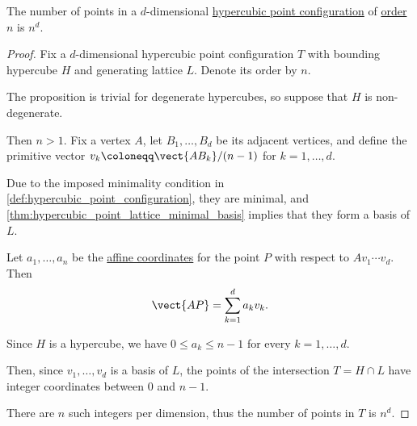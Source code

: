 \begin{proposition}\label{thm:hypercubic_point_configuration_cardinality}
  The number of points in a \( d \)-dimensional \hyperref[def:hypercubic_point_configuration]{hypercubic point configuration} of \hyperref[def:hypercubic_point_configuration_order]{order} \( n \) is \( n^d \).
\end{proposition}
\begin{proof}
  Fix a \( d \)-dimensional hypercubic point configuration \( T \) with bounding hypercube \( H \) and generating lattice \( L \). Denote its order by \( n \).

  The proposition is trivial for degenerate hypercubes, so suppose that \( H \) is non-degenerate.

  Then \( n > 1 \). Fix a vertex \( A \), let \( B_1, \ldots, B_d \) be its adjacent vertices, and define the primitive vector \( v_k \coloneqq \vect{A B_k} / (n - 1) \) for \( k = 1, \ldots, d \).

  Due to the imposed minimality condition in \cref{def:hypercubic_point_configuration}, they are minimal, and \cref{thm:hypercubic_point_lattice_minimal_basis} implies that they form a basis of \( L \).

  Let \( a_1, \ldots, a_n \) be the \hyperref[def:affine_coordinate_system]{affine coordinates} for the point \( P \) with respect to \( A v_1 \cdots v_d \). Then
  \begin{equation*}
    \vect{AP} = \sum_{k=1}^d a_k v_k.
  \end{equation*}

  Since \( H \) is a hypercube, we have \( 0 \leq a_k \leq n - 1 \) for every \( k = 1, \ldots, d \).

  Then, since \( v_1, \ldots, v_d \) is a basis of \( L \), the points of the intersection \( T = H \cap L \) have integer coordinates between \( 0 \) and \( n - 1 \).

  There are \( n \) such integers per dimension, thus the number of points in \( T \) is \( n^d \).
\end{proof}

